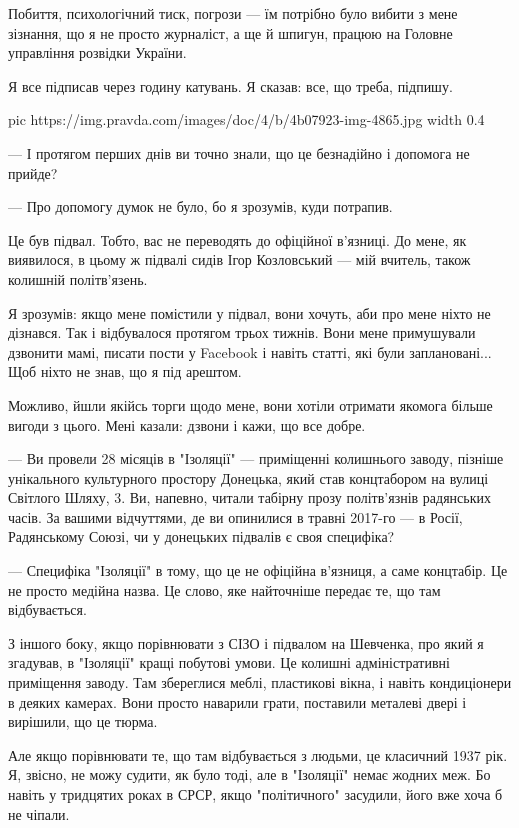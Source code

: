 Побиття, психологічний тиск, погрози — їм потрібно було вибити з мене зізнання,
що я не просто журналіст, а ще й шпигун, працюю на Головне управління розвідки
України.

Я все підписав через годину катувань. Я сказав: все, що треба, підпишу.


\ifcmt
  pic https://img.pravda.com/images/doc/4/b/4b07923-img-4865.jpg
	width 0.4
\fi

— І протягом перших днів ви точно знали, що це безнадійно і допомога не прийде?

— Про допомогу думок не було, бо я зрозумів, куди потрапив.

Це був підвал. Тобто, вас не переводять до офіційної в’язниці. До мене, як
виявилося, в цьому ж підвалі сидів Ігор Козловський — мій вчитель, також
колишній політв’язень.

Я зрозумів: якщо мене помістили у підвал, вони хочуть, аби про мене ніхто не
дізнався. Так і відбувалося протягом трьох тижнів. Вони мене примушували
дзвонити мамі, писати пости у Facebook і навіть статті, які були заплановані...
Щоб ніхто не знав, що я під арештом.

Можливо, йшли якійсь торги щодо мене, вони хотіли отримати якомога більше
вигоди з цього. Мені казали: дзвони і кажи, що все добре.

— Ви провели 28 місяців в "Ізоляції" — приміщенні колишнього заводу, пізніше
унікального культурного простору Донецька, який став концтабором на вулиці
Світлого Шляху, 3. Ви, напевно, читали табірну прозу політв'язнів радянських
часів. За вашими відчуттями, де ви опинилися в травні 2017-го — в Росії,
Радянському Союзі, чи у донецьких підвалів є своя специфіка?

— Специфіка "Ізоляції" в тому, що це не офіційна в’язниця, а саме концтабір. Це
не просто медійна назва. Це слово, яке найточніше передає те, що там
відбувається.

З іншого боку, якщо порівнювати з СІЗО і підвалом на Шевченка, про який я
згадував, в "Ізоляції" кращі побутові умови. Це колишні адміністративні
приміщення заводу. Там збереглися меблі, пластикові вікна, і навіть
кондиціонери в деяких камерах. Вони просто наварили грати, поставили металеві
двері і вирішили, що це тюрма.

Але якщо порівнювати те, що там відбувається з людьми, це класичний 1937 рік.
Я, звісно, не можу судити, як було тоді, але в "Ізоляції" немає жодних меж. Бо
навіть у тридцятих роках в СРСР, якщо "політичного" засудили, його вже хоча б
не чіпали.

